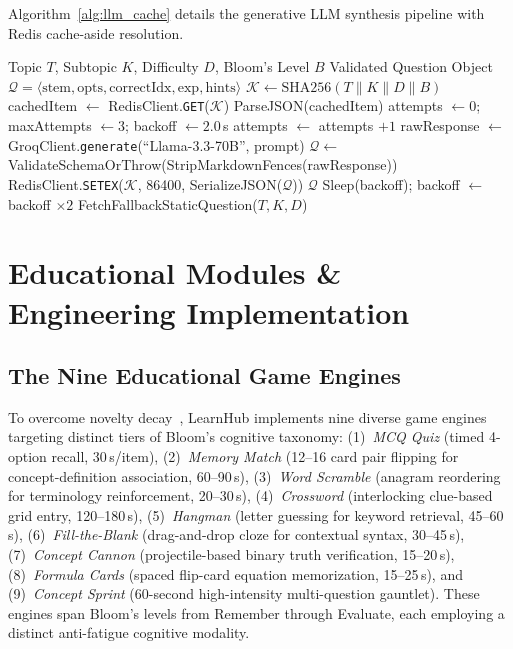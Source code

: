 \documentclass[journal]{IEEEtran}
\begin{document}
Algorithm~\ref{alg:llm_cache} details the generative LLM synthesis pipeline with Redis cache-aside resolution.

\begin{algorithm}[!t]
\caption{LLM Question Generation with Redis Cache-Aside}
\label{alg:llm_cache}
{\footnotesize
\begin{algorithmic}[1]
\REQUIRE Topic $T$, Subtopic $K$, Difficulty $D$, Bloom's Level $B$
\ENSURE Validated Question Object $\mathcal{Q} = \langle \text{stem}, \text{opts}, \text{correctIdx}, \text{exp}, \text{hints} \rangle$
\STATE $\mathcal{K} \gets \text{SHA256}(T \parallel K \parallel D \parallel B)$
\STATE cachedItem $\gets$ RedisClient.\texttt{GET}($\mathcal{K}$)
\RETURN ParseJSON(cachedItem) 
\ENDIF
\STATE attempts $\gets 0$; maxAttempts $\gets 3$; backoff $\gets 2.0$\,s
\STATE attempts $\gets$ attempts $+ 1$
\TRY
\STATE rawResponse $\gets$ GroqClient.\texttt{generate}(``Llama-3.3-70B'', prompt)
\STATE $\mathcal{Q} \gets$ ValidateSchemaOrThrow(StripMarkdownFences(rawResponse))
\STATE RedisClient.\texttt{SETEX}($\mathcal{K}$, 86400, SerializeJSON($\mathcal{Q}$))
\RETURN $\mathcal{Q}$
\STATE Sleep(backoff); backoff $\gets$ backoff $\times 2$
\ENDTRY
\ENDWHILE
\RETURN FetchFallbackStaticQuestion($T, K, D$)
\end{algorithmic}
}
\end{algorithm}

\section{Educational Modules \& Engineering Implementation}
\label{sec:implementation}
\subsection{The Nine Educational Game Engines}
To overcome novelty decay~\cite{wang2020}, LearnHub implements nine diverse game engines targeting distinct tiers of Bloom's cognitive taxonomy: (1)~\emph{MCQ Quiz} (timed 4-option recall, 30\,s/item), (2)~\emph{Memory Match} (12--16 card pair flipping for concept-definition association, 60--90\,s), (3)~\emph{Word Scramble} (anagram reordering for terminology reinforcement, 20--30\,s), (4)~\emph{Crossword} (interlocking clue-based grid entry, 120--180\,s), (5)~\emph{Hangman} (letter guessing for keyword retrieval, 45--60\,s), (6)~\emph{Fill-the-Blank} (drag-and-drop cloze for contextual syntax, 30--45\,s), (7)~\emph{Concept Cannon} (projectile-based binary truth verification, 15--20\,s), (8)~\emph{Formula Cards} (spaced flip-card equation memorization, 15--25\,s), and (9)~\emph{Concept Sprint} (60-second high-intensity multi-question gauntlet). These engines span Bloom's levels from Remember through Evaluate, each employing a distinct anti-fatigue cognitive modality.
\end{document}
